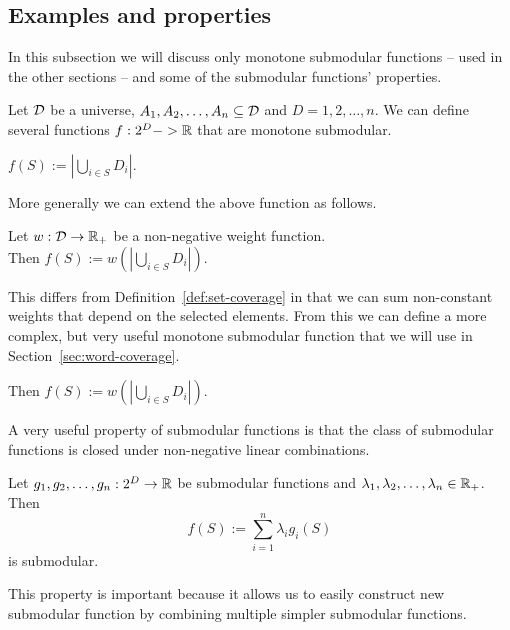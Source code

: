 
\subsection{Examples and properties}

In this subsection we will discuss only monotone submodular functions --
used in the other sections -- and some of the submodular functions'
properties.

Let \(\mathcal{D}\) be a universe, \(A_1, A_2, \ldots, A_n \subseteq \mathcal{D}\) and \(D = {1,
2, \dots, n}\). We can define several functions \(f : 2^D -> \mathbb{R}\) that are
monotone submodular. 
\begin{definition}
  \label{def:set-coverage}
  \(f(S) := |\bigcup_{i \in S} D_i|\).
\end{definition}
More generally we can extend the above function as follows.
\begin{definition}
  \label{def:weighted-coverage}
  Let \(w : \mathcal{D} \to \mathbb{R}_+\) be a non-negative weight function. \\
  Then \(f(S) := w(|\bigcup_{i \in S} D_i|)\).
\end{definition}
This differs from Definition~\ref{def:set-coverage} in that we can sum
non-constant weights that depend on the selected elements. From this we can
define a more complex, but very useful monotone submodular function that we will
use in Section~\ref{sec:word-coverage}.
\begin{definition}
  \label{def:-coverage}
  Then \(f(S) := w(|\bigcup_{i \in S} D_i|)\).
\end{definition}

A very useful property of submodular functions is that the class of submodular
functions is closed under non-negative linear combinations. 
\begin{proposition}
\label{prop:linear-combinations}
  Let \(g_1, g_2, \ldots, g_n : 2^D \to \mathbb{R} \) be submodular functions and \(\lambda_1, \lambda_2, \ldots, \lambda_n \in \mathbb{R}_+\). \\
  Then
  \[f(S) := \sum_{i=1}^n \lambda_i g_i(S)\]
  is submodular.
\end{proposition}
This property is important because it allows us to easily construct new
submodular function by combining multiple simpler submodular functions.

